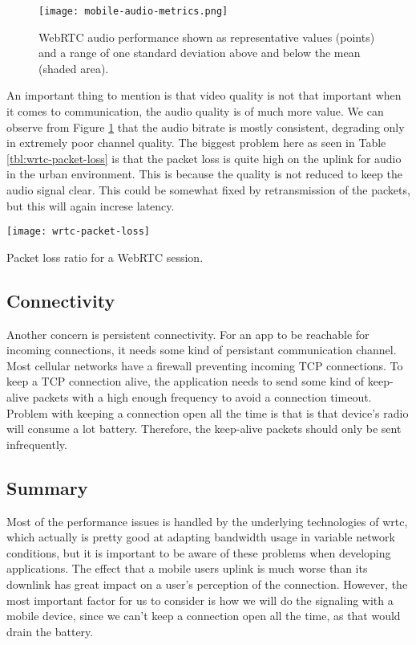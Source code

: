\pagebreak
\begin{figure}[here]
\centerline{\texttt{[image: mobile-audio-metrics.png]}}
\caption{WebRTC audio performance shown as representative values
(points) and a range of one standard deviation above and below the
mean (shaded area).}
\label{fig:mobile-audio-metrics}
\end{figure}

An important thing to mention is that video quality is not that important when it comes to communication, the audio quality is of much more value. We can observe from Figure \ref{fig:mobile-audio-metrics} that the audio bitrate is mostly consistent, degrading only in extremely poor channel quality. The biggest problem here as seen in Table \ref{tbl:wrtc-packet-loss} is that the packet loss is quite high on the uplink for audio in the urban environment. This is because the quality is not reduced to keep the audio signal clear. This could be somewhat fixed by retransmission of the packets, but this will again increse latency.
\\
\begin{table}[here]
\centerline{\texttt{[image: wrtc-packet-loss]}}
\caption{Packet loss ratio for a WebRTC session.}
\label{tbl:wrtc-packet-loss}
\end{table}

\subsection{Connectivity}
Another concern is persistent connectivity. For an app to be reachable for incoming connections, it needs some kind of persistant communication channel. Most cellular networks have a firewall preventing incoming TCP connections\cite{isomaki2012considerations}. To keep a TCP connection alive, the application needs to send some kind of keep-alive packets with a high enough frequency to avoid a connection timeout. Problem with keeping a connection open all the time is that is that device's radio will consume a lot battery. Therefore, the keep-alive packets should only be sent infrequently.

\subsection{Summary}
Most of the performance issues is handled by the underlying technologies of \gls{wrtc}, which actually is pretty good at adapting bandwidth usage in variable network conditions, but it is important to be aware of these problems when developing applications. The effect that a mobile users uplink is much worse than its downlink has great impact on a user's perception of the connection. However, the most important factor for us to consider is how we will do the signaling with a mobile device, since we can't keep a connection open all the time, as that would drain the battery.